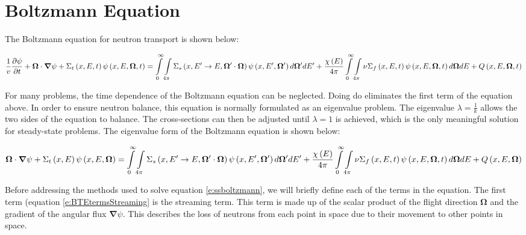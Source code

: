 \section{Boltzmann Equation}

The Boltzmann equation for neutron transport is shown below: 

\begin{dmath}\label{e:boltzmann}
{\frac{1}{v} \frac{\partial \psi}{\partial t} + \bm \Omega \cdot \bm \nabla \psi + \Sigma_t\left(x,E,t\right)\psi\left(x,E,\bm \Omega,t\right)} = {\intop_0^{\infty} \intop_{4\pi} \Sigma_s\left(x,E' \rightarrow E, \bm \Omega' \cdot \bm \Omega\right) \psi\left(x,E',\bm \Omega'\right) d\bm \Omega' dE'} + {\frac{\chi\left(E\right)}{4\pi} \intop_0^{\infty} \intop_{4\pi} \nu \Sigma_f\left(x,E,t\right) \psi\left(x,E,\bm \Omega,t\right) d\bm\Omega dE + Q\left(x,E,\bm \Omega,t\right)}
\end{dmath}

For many problems, the time dependence of the Boltzmann equation can be neglected.  Doing do eliminates the first term of the equation above.  In order to ensure neutron balance, this equation is normally formulated as an eigenvalue problem.  The eigenvalue $\lambda = \frac{1}{k}$ allows the two sides of the equation to balance.  The cross-sections can then be adjusted until $\lambda = 1$ is achieved, which is the only meaningful solution for steady-state problems.  The eigenvalue form of the Boltzmann equation is shown below:

\begin{dmath}\label{e:ssboltzmann}
{\bm \Omega \cdot \bm \nabla \psi + \Sigma_t\left(x,E\right)\psi\left(x,E,\bm \Omega\right) = \intop_0^{\infty} \intop_{4\pi} \Sigma_s\left(x,E' \rightarrow E, \bm \Omega' \cdot \bm \Omega\right) \psi\left(x,E',\bm \Omega'\right) d\bm \Omega' dE'} + {\frac{\chi\left(E\right)}{4\pi} \intop_0^{\infty} \intop_{4\pi} \nu \Sigma_f\left(x,E,t\right) \psi\left(x,E,\bm \Omega,t\right) d\bm\Omega dE + Q\left(x,E,\bm \Omega\right)}
\end{dmath}

Before addressing the methods used to solve equation \ref{e:ssboltzmann}, we will briefly define each of the terms in the equation.  The first term (equation \ref{e:BTEtermsStreaming} is the streaming term.  This term is made up of the scalar product of the flight direction $\bm \Omega$ and the gradient of the angular flux $\bm \nabla \psi$.  This describes the loss of neutrons from each point in space due to their movement to other points in space.

